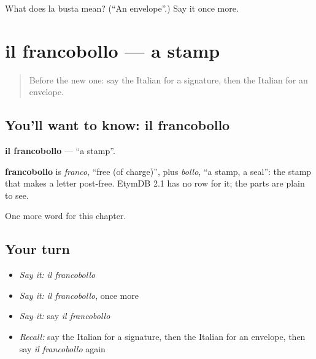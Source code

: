 \begin{tcolorbox}[breakable,colback=teal!4,colframe=teal!35!black,title={Before you move on}]
What does la busta mean? (\textquotedblleft{}An envelope\textquotedblright{}.) Say it once more.
\end{tcolorbox}
\section[il francobollo]{il francobollo — a stamp}

\label{lesson:IT-C166-francobollo}



\begin{quote}
Before the new one: say the Italian for a signature, then the Italian for an envelope.
\end{quote}

\subsection*{You'll want to know: il francobollo}
\textbf{il francobollo} — \textquotedblleft{}a stamp\textquotedblright{}.

\begin{cousinweb}
\textbf{francobollo} is \emph{franco}, \textquotedblleft{}free (of charge)\textquotedblright{}, plus \emph{bollo}, \textquotedblleft{}a stamp, a seal\textquotedblright{}: the stamp that makes a letter post-free. EtymDB 2.1 has no row for it; the parts are plain to see.
\end{cousinweb}

\begin{grammarlens}[title={What you've built}]
One more word for this chapter.
\end{grammarlens}

\subsection*{Your turn}
\begin{itemize}
\raggedright
  \item \emph{Say it:} \emph{il francobollo}
  \item \emph{Say it:} \emph{il francobollo}, once more
  \item \emph{Say it:} say \emph{il francobollo}
  \item \emph{Recall:} say the Italian for a signature, then the Italian for an envelope, then say \emph{il francobollo} again
\end{itemize}

